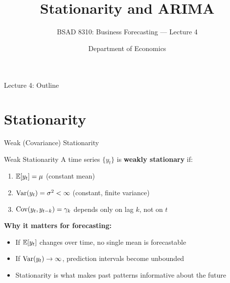 \documentclass[aspectratio=169, 11pt]{beamer}
\title{Stationarity and ARIMA}
\subtitle{BSAD 8310: Business Forecasting --- Lecture 4}
\author{Department of Economics}
\institute{University of Nebraska at Omaha}
\begin{document}

\begin{frame}
  \titlepage
\end{frame}

\begin{frame}{Lecture 4: Outline}
  \tableofcontents
\end{frame}

\section{Stationarity}


\begin{frame}{Weak (Covariance) Stationarity}
  \begin{definitionbox}{Weak Stationarity}
    A time series $\{y_t\}$ is \textbf{weakly stationary} if:
    \begin{enumerate}\small
      \item $\mathbb{E}[y_t] = \mu$ \quad (constant mean)
      \item $\operatorname{Var}(y_t) = \sigma^2 < \infty$ \quad (constant, finite variance)
      \item $\operatorname{Cov}(y_t, y_{t-k}) = \gamma_k$ depends only on lag $k$,
            not on $t$
    \end{enumerate}
  \end{definitionbox}
  \vspace{0.1cm}
  \textbf{Why it matters for forecasting:}
  \begin{itemize}\small
    \item If $\mathbb{E}[y_t]$ changes over time, no single mean is forecastable
    \item If $\operatorname{Var}(y_t) \to \infty$, prediction intervals become unbounded
    \item Stationarity is what makes past patterns informative about the future
  \end{itemize}
\end{frame}
\end{document}
